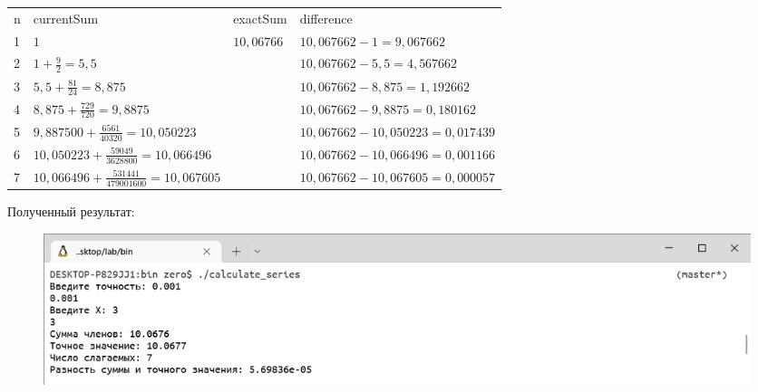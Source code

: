 \documentclass[a4paper]{article}
\begin{document}
\begin{enumerate}[label=\textbf{Тест \arabic*},start=3]
		\begin{tabular}{l|l|l|l}
			n & currentSum                                           & exactSum                    & difference                           \\
			1 & $ 1 $                                                & \multirow{7}{*}{$10,06766$} & $ 10,067662 - 1 = 9,067662 $         \\
			2 & $ 1 + \frac{9}{2} = 5,5 $                            &                             & $ 10,067662 - 5,5 = 4,567662 $       \\
			3 & $ 5,5 + \frac{81}{24} = 8,875 $                      &                             & $ 10,067662 - 8,875 = 1,192662 $     \\
			4 & $ 8,875 + \frac{729}{720} = 9,8875 $                 &                             & $ 10,067662 - 9,8875 = 0,180162 $    \\
			5 & $ 9,887500 + \frac{6561}{40320} = 10,050223 $        &                             & $ 10,067662 - 10,050223 = 0,017439 $ \\
			6 & $ 10,050223 + \frac{59049}{3628800} = 10,066496 $    &                             & $ 10,067662 - 10,066496 = 0,001166 $ \\
			7 & $ 10,066496 + \frac{531441}{479001600} = 10,067605 $ &                             & $ 10,067662 - 10,067605 = 0,000057 $
		\end{tabular}
		
		Полученный результат:
		
		\begin{figure}[h]
			\includegraphics[width=\textwidth,trim=0.5mm 0 0 0.5mm,clip]{tests/test0.001.png}
		\end{figure}
		

\end{enumerate}
\end{document}

